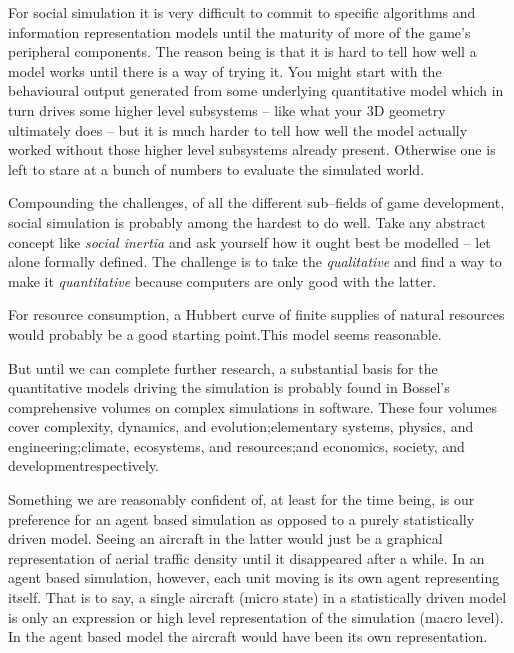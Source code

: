 For social simulation it is very difficult to commit to specific algorithms and information representation models until the maturity of more of the game's peripheral components. The reason being is that it is hard to tell how well a model works until there is a way of trying it. You might start with the behavioural output generated from some underlying quantitative model which in turn drives some higher level subsystems -- like what your 3D geometry ultimately does -- but it is much harder to tell how well the model actually worked without those higher level subsystems already present. Otherwise one is left to stare at a bunch of numbers to evaluate the simulated world.

Compounding the challenges, of all the different sub--fields of game development, social simulation is probably among the hardest to do well. Take any abstract concept like {\it social inertia} and ask yourself how it ought best be modelled -- let alone formally defined. The challenge is to take the {\it qualitative} and find a way to make it {\it quantitative} because computers are only good with the latter.

For resource consumption, a Hubbert curve of finite supplies of natural resources would probably be a good starting point. This model seems reasonable.

But until we can complete further research, a substantial basis for the quantitative models driving the simulation is probably found in Bossel's comprehensive volumes on complex simulations in software. These four volumes cover complexity, dynamics, and evolution; elementary systems, physics, and engineering; climate, ecosystems, and resources; and economics, society, and development respectively.


Something we are reasonably confident of, at least for the time being, is our preference for an agent based simulation as opposed to a purely statistically driven model. Seeing an aircraft in the latter would just be a graphical representation of aerial traffic density until it disappeared after a while. In an agent based simulation, however, each unit moving is its own  agent representing itself. That is to say, a single aircraft (micro state) in a statistically driven model is only an expression or high level representation of the simulation (macro level). In the agent based model the aircraft would have been its own representation.

